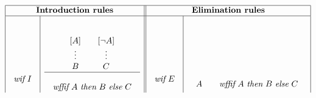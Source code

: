 \renewcommand{\arraystretch}{0.5}
\[
\begin{array}{|c|c||c|c|} \hline 
\multicolumn{2}{|c||}{\mbox{\bf Introduction rules}} &
\multicolumn{2}{c|}{\mbox{\bf Elimination rules}} \\ \hline
\begin{array}{l}
\\ \\ \\ \\ \\
\mbox{{\em wif}} \  I  
\end{array}
&
\begin{array}{cc}
\\ \\
\begin{array}{c}
{[A]}\\
\vdots\\
B
\end{array}
\ \ \ 
\begin{array}{c}
{[\neg A]}\\
\vdots\\
C
\end{array}
\\
\hline\\
\begin{array}{c}
\mbox{{\em wffif}} \ A \ \mbox{{\em then}} \ B \ \mbox{{\em else}} \ C 
\end{array}
\end{array}
&
\begin{array}{l}
\\ \\ \\ \\ \\
\mbox{{\em wif}} \  E
\end{array}
&
\begin{array}{cc}
\\ \\
\begin{array}{c}
\\ \\ \\ \\
A
\end{array}
\ \ \ 
\begin{array}{c}
\\ \\ \\ \\
\mbox{{\em wffif}} \ A \ \mbox{{\em then}} \ B \ \mbox{{\em else}} \ C 
\end{array}

\end{array}
\end{array}\]
